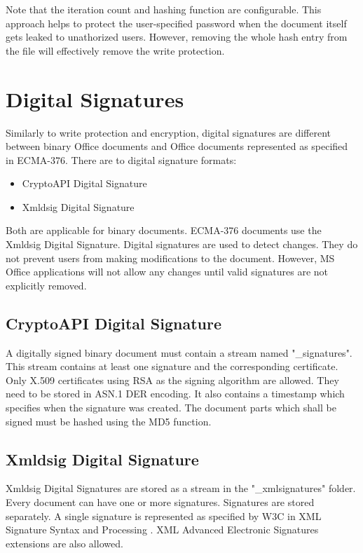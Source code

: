 \documentclass[11pt,oneside]{fithesis2}
\begin{document}
Note that the iteration count and hashing function are configurable. This approach helps to protect the user-specified password when the document itself gets leaked to unathorized users. However, removing the whole hash entry from the file will effectively remove the write protection.

\section{Digital Signatures}\label{data_integrity}

Similarly to write protection and encryption, digital signatures are different between binary Office documents and Office documents represented as specified in ECMA-376. There are to digital signature formats:

\begin{itemize}
\setlength\itemsep{0.1em}
	\item{CryptoAPI Digital Signature}
	\item{Xmldsig Digital Signature}
\end{itemize}

Both are applicable for binary documents. ECMA-376 documents use the Xmldsig Digital Signature. Digital signatures are used to detect changes. They do not prevent users from making modifications to the document. However, MS Office applications will not allow any changes until valid signatures are not explicitly removed.

\subsection{CryptoAPI Digital Signature} 

A digitally signed binary document must contain a stream named "\_signatures". This stream contains at least one signature and the corresponding certificate. Only X.509 certificates using RSA as the signing algorithm are allowed. They need to be stored in ASN.1 DER encoding. It also contains a timestamp which specifies when the signature was created. The document parts which shall be signed must be hashed using the MD5 function. 


\subsection{Xmldsig Digital Signature}

Xmldsig Digital Signatures are stored as a stream in the "\_xmlsignatures" folder. Every document can have one or more signatures. Signatures are stored separately. A single signature is represented as specified by W3C in XML Signature Syntax and Processing \cite{xmlsig}. XML Advanced Electronic Signatures \cite{xades} extensions are also allowed.
\end{document}
